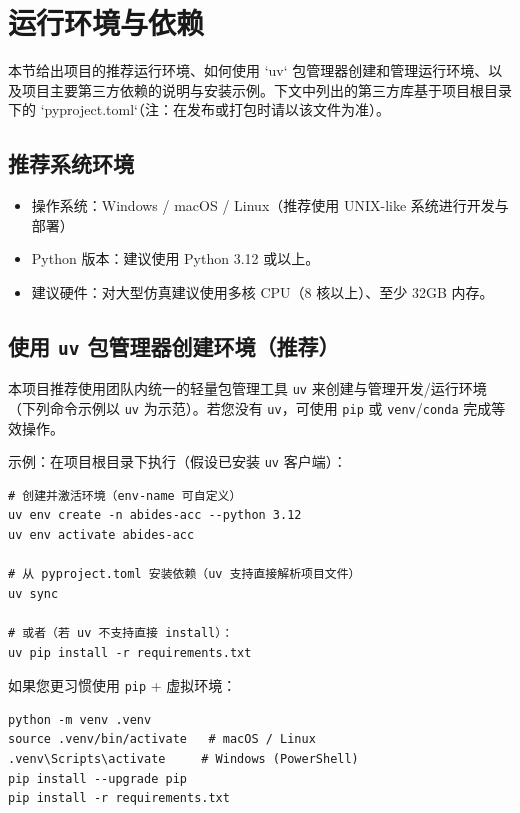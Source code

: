 \documentclass{mancls}
\begin{document}
\newpage
\section{运行环境与依赖}
本节给出项目的推荐运行环境、如何使用 `uv` 包管理器创建和管理运行环境、以及项目主要第三方依赖的说明与安装示例。下文中列出的第三方库基于项目根目录下的 `pyproject.toml`（注：在发布或打包时请以该文件为准）。

\subsection{推荐系统环境}
\begin{itemize}
  \item 操作系统：Windows / macOS / Linux（推荐使用 UNIX-like 系统进行开发与部署）
  \item Python 版本：建议使用 Python 3.12 或以上。
  \item 建议硬件：对大型仿真建议使用多核 CPU（8 核以上）、至少 32GB 内存。
\end{itemize}

\subsection{使用 \texttt{uv} 包管理器创建环境（推荐）}
本项目推荐使用团队内统一的轻量包管理工具 \texttt{uv} 来创建与管理开发/运行环境（下列命令示例以 \texttt{uv} 为示范）。若您没有 \texttt{uv}，可使用 \texttt{pip} 或 \texttt{venv}/\texttt{conda} 完成等效操作。

示例：在项目根目录下执行（假设已安装 \texttt{uv} 客户端）：
\begin{verbatim}
# 创建并激活环境（env-name 可自定义）
uv env create -n abides-acc --python 3.12
uv env activate abides-acc

# 从 pyproject.toml 安装依赖（uv 支持直接解析项目文件）
uv sync

# 或者（若 uv 不支持直接 install）：
uv pip install -r requirements.txt
\end{verbatim}

如果您更习惯使用 \texttt{pip} + 虚拟环境：
\begin{verbatim}
python -m venv .venv
source .venv/bin/activate   # macOS / Linux
.venv\Scripts\activate     # Windows (PowerShell)
pip install --upgrade pip
pip install -r requirements.txt
\end{verbatim}
\end{document}
